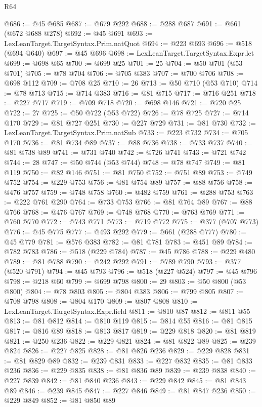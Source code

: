 \begin{lexlean}{R64}
\begin{coremodule}
@686 := @45 @685
@687 := @679 @292
@688 := @288 @687
@691 := @661 (@672 @688 @278)
@692 := @45 @691
@693 := LexLeanTarget.TargetSyntax.Prim.natQuot
@694 := @223 @693
@696 := @518 (@694 @640)
@697 := @45 @696
@698 := LexLeanTarget.TargetSyntax.Expr.let
@699 := @698 @65
@700 := @699 @25
@701 := 25
@704 := @50 @701 (@53 @701)
@705 := @78 @704
@706 := @705 @383
@707 := @700 @706
@708 := @698 @112
@709 := @708 @25
@710 := 26
@713 := @50 @710 (@53 @710)
@714 := @78 @713
@715 := @714 @383
@716 := @81 @715
@717 := @716 @251
@718 := @227 @717
@719 := @709 @718
@720 := @698 @146
@721 := @720 @25
@722 := 27
@725 := @50 @722 (@53 @722)
@726 := @78 @725
@727 := @714 @170
@729 := @81 @727 @251
@730 := @227 @729
@731 := @81 @730
@732 := LexLeanTarget.TargetSyntax.Prim.natSub
@733 := @223 @732
@734 := @705 @170
@736 := @81 @734 @89
@737 := @88 @736
@738 := @733 @737
@740 := @81 @738 @89
@741 := @731 @740
@742 := @726 @741
@743 := @721 @742
@744 := 28
@747 := @50 @744 (@53 @744)
@748 := @78 @747
@749 := @81 @119
@750 := @82 @146
@751 := @81 @750
@752 := @751 @89
@753 := @749 @752
@754 := @229 @753
@756 := @81 @754 @89
@757 := @88 @756
@758 := @476 @757
@759 := @748 @758
@760 := @482 @759
@761 := @288 @753
@763 := @222 @761 @290
@764 := @733 @753
@766 := @81 @764 @89
@767 := @88 @766
@768 := @476 @767
@769 := @748 @768
@770 := @763 @769
@771 := @760 @770
@772 := @743 @771
@773 := @719 @772
@775 := @377 (@707 @773)
@776 := @45 @775
@777 := @493 @292
@779 := @661 (@288 @777)
@780 := @45 @779
@781 := @576 @383
@782 := @81 @781
@783 := @451 @89
@784 := @782 @783
@786 := @518 (@229 @784)
@787 := @45 @786
@788 := @229 @480
@789 := @81 @788
@790 := @242 @292
@791 := @789 @790
@793 := @377 (@520 @791)
@794 := @45 @793
@796 := @518 (@227 @524)
@797 := @45 @796
@798 := @218 @60
@799 := @699 @798
@800 := 29
@803 := @50 @800 (@53 @800)
@804 := @78 @803
@805 := @804 @383
@806 := @799 @805
@807 := @708 @798
@808 := @804 @170
@809 := @807 @808
@810 := LexLeanTarget.TargetSyntax.Expr.field
@811 := @810 @87
@812 := @811 @55
@813 := @81 @812
@814 := @810 @119
@815 := @814 @55
@816 := @81 @815
@817 := @816 @89
@818 := @813 @817
@819 := @229 @818
@820 := @81 @819
@821 := @250 @236
@822 := @229 @821
@824 := @81 @822 @89
@825 := @239 @824
@826 := @227 @825
@828 := @81 @826 @236
@829 := @229 @828
@831 := @81 @829 @89
@832 := @239 @831
@833 := @227 @832
@835 := @81 @833 @236
@836 := @229 @835
@838 := @81 @836 @89
@839 := @239 @838
@840 := @227 @839
@842 := @81 @840 @236
@843 := @229 @842
@845 := @81 @843 @89
@846 := @239 @845
@847 := @227 @846
@849 := @81 @847 @236
@850 := @229 @849
@852 := @81 @850 @89

\end{coremodule}
\end{lexlean}
